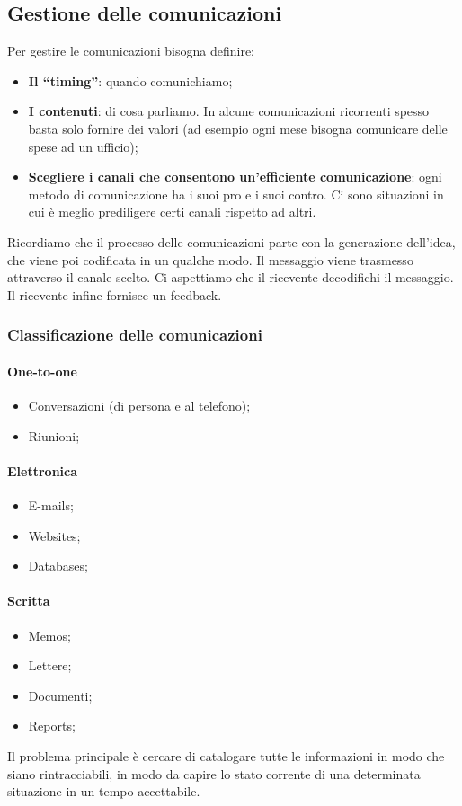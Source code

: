 \subsection{Gestione delle comunicazioni}
Per gestire le comunicazioni bisogna definire:
\begin{itemize}
	\item \textbf{Il “timing”}: quando comunichiamo;
	\item \textbf{I contenuti}: di cosa parliamo. In alcune comunicazioni ricorrenti spesso basta solo fornire dei valori (ad esempio ogni mese bisogna comunicare delle spese ad un ufficio);
	\item \textbf{Scegliere i canali che consentono un’efficiente comunicazione}: ogni metodo di comunicazione ha i suoi pro e i suoi contro. Ci sono situazioni in cui è meglio prediligere certi canali rispetto ad altri.
\end{itemize}
Ricordiamo che il processo delle comunicazioni parte con la generazione dell'idea, che viene poi codificata in un qualche modo. Il messaggio viene trasmesso attraverso il canale scelto. Ci aspettiamo che il ricevente decodifichi il messaggio. Il ricevente infine fornisce un feedback.

\subsubsection{Classificazione delle comunicazioni}
\paragraph{One-to-one}
\begin{itemize}
	\item Conversazioni (di persona e al telefono);
	\item Riunioni;
\end{itemize}
\paragraph{Elettronica}
\begin{itemize}
	\item E-mails;
	\item Websites;
	\item Databases;
\end{itemize}
\paragraph{Scritta}
\begin{itemize}
	\item Memos;
	\item Lettere;
	\item Documenti;
	\item Reports;
\end{itemize}
Il problema principale è cercare di catalogare tutte le informazioni in modo che siano rintracciabili, in modo da capire lo stato corrente di una determinata situazione in un tempo accettabile.

